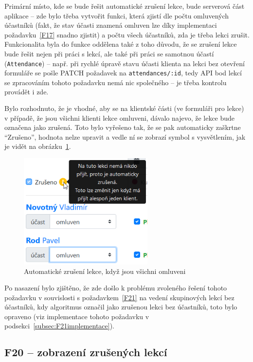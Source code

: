 Primární místo, kde se bude řešit automatické zrušení lekce, bude serverová část aplikace -- zde bylo třeba vytvořit funkci, která zjistí dle počtu omluvených účastníků (fakt, že stav účasti znamená omluven lze díky implementaci požadavku~\ref{F17} snadno zjistit) a počtu všech účastníků, zda je třeba lekci zrušit. Funkcionalita byla do funkce oddělena také z toho důvodu, že se zrušení lekce bude řešit nejen při práci s lekcí, ale také při práci se samotnou účastí (\verb|Attendance|) -- např. při rychlé úpravě stavu účasti klienta na lekci bez otevření formuláře se pošle PATCH požadavek na \verb|attendances/:id|, tedy API bod lekcí se zpracováním tohoto požadavku nemá nic společného -- je třeba kontrolu provádět i zde.

Bylo rozhodnuto, že je vhodné, aby se na klientské části (ve formuláři pro lekce) v případě, že jsou všichni klienti lekce omluveni, dávalo najevo, že lekce bude označena jako zrušená. Toto bylo vyřešeno tak, že se pak automaticky zaškrtne \enquote{Zrušeno}, hodnota nelze upravit a vedle ní se zobrazí symbol s vysvětlením, jak je vidět na obrázku~\ref{fig:ui-screen-automatickezruseni}.

\begin{figure}[h]\centering
    \includegraphics[width=0.6\textwidth]{img/ui-screen-automatickezruseni.png}
    \caption{Automatické zrušení lekce, když jsou všichni omluveni}\label{fig:ui-screen-automatickezruseni}
\end{figure}

Po nasazení bylo zjištěno, že zde došlo k problému zvoleného řešení tohoto požadavku v souvislosti s požadavkem~\ref{F21} na vedení skupinových lekcí bez účastníků, kdy algoritmus označil jako zrušenou lekci bez účastníků, toto bylo opraveno (viz implementace tohoto požadavku v podsekci~\ref{subsec:F21implementace}).

\subsection{F20 -- zobrazení zrušených lekcí}


